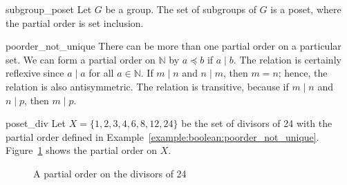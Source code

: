 \begin{example}{subgroup_poset}
Let $G$ be a group. The set of subgroups of $G$ is a poset, where the partial order is set inclusion.
\end{example}


\begin{example}{poorder_not_unique}
There can be more than one partial order on a particular set.  We can form a partial order on ${\mathbb N}$ by $a \preceq b$ if $a \mid b$.  The relation is certainly reflexive since $a \mid a$ for all $a \in {\mathbb N}$.  If $m \mid n$ and $n \mid m$, then $m = n$; hence, the relation is also antisymmetric.  The relation is transitive, because if $m \mid n$ and $n \mid p$, then $m \mid p$.
\end{example}


\begin{example}{poset_div}
Let $X = \{ 1, 2, 3, 4, 6, 8, 12, 24 \}$ be the set of divisors of 24 with the partial order defined in Example~\ref{example:boolean:poorder_not_unique}. Figure~\ref{Poset1} shows the partial order on $X$. 
\end{example}


\begin{figure}[htb]
\begin{center}

\end{center}
\caption{A partial order on the divisors of 24}
\label{Poset1}
\end{figure}

